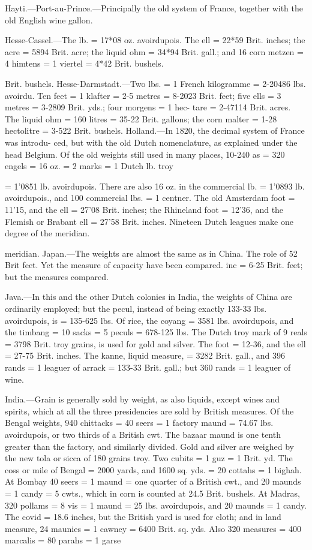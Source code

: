 \documentclass{article}
\begin{document}
Hayti.—Port-au-Prince.—Principally the old system of France, together with the old English wine gallon.

Hesse-Cassel.—The lb. = 17*08 oz. avoirdupois. The ell = 22*59 Brit. inches; the acre = 5894 Brit. acre; the liquid ohm = 34*94 Brit. gall.; and 16 corn metzen = 4 himtens = 1 viertel = 4*42 Brit. bushels.

Brit. bushels.
Hesse-Darmstadt.—Two lbs. = 1 French kilogramme = 2-20486
lbs. avoirdu. Ten feet = 1 klafter = 2-5 metres = 8-2023 Brit. feet;
five ells = 3 metres = 3-2809 Brit. yds.; four morgens = 1 hec-
tare = 2-47114 Brit. acres. The liquid ohm = 160 litres = 35-22
Brit. gallons; the corn malter = 1-28 hectolitre = 3-522 Brit.
bushels.
Holland.—In 1820, the decimal system of France was introdu-
ced, but with the old Dutch nomenclature, as explained under the
head Belgium. Of the old weights still used in many places,
10-240 as = 320 engels = 16 oz. = 2 marks = 1 Dutch lb. troy

= 1'0851 lb. avoirdupois. There are also 16 oz. in the commercial lb. = 1'0893 lb. avoirdupois., and 100 commercial lbs. = 1 centner. The old Amsterdam foot = 11'15, and the ell = 27'08 Brit. inches; the Rhineland foot = 12'36, and the Flemish or Brabant ell = 27'58 Brit. inches. Nineteen Dutch leagues make one degree of the meridian.

meridian.
Japan.—The weights are almost the same as in China. The role of 52 Brit feet. Yet the measure of capacity have been compared.
inc = 6-25 Brit. feet; but the measures compared.

Java.—In this and the other Dutch colonies in India, the weights of China are ordinarily employed; but the pecul, instead of being exactly 133-33 lbs. avoirdupois, is = 135-625 lbs. Of rice, the coyang = 3581 lbs. avoirdupois, and the timbang = 10 sacks = 5 peculs = 678-125 lbs. The Dutch troy mark of 9 reals = 3798 Brit. troy grains, is used for gold and silver. The foot = 12-36, and the ell = 27-75 Brit. inches. The kanne, liquid measure, = 3282 Brit. gall., and 396 rands = 1 leaguer of arrack = 133-33 Brit. gall.; but 360 rands = 1 leaguer of wine.

India.—Grain is generally sold by weight, as also liquids, except wines and spirits, which at all the three presidencies are sold by British measures. Of the Bengal weights, 940 chittacks = 40 seers = 1 factory maund = 74.67 lbs. avoirdupois, or two thirds of a British cwt. The bazaar maund is one tenth greater than the factory, and similarly divided. Gold and silver are weighed by the new tola or sicca of 180 grains troy. Two cubits = 1 guz = 1 Brit. yd. The coss or mile of Bengal = 2000 yards, and 1600 sq. yds. = 20 cottahs = 1 bighah. At Bombay 40 seers = 1 maund = one quarter of a British cwt., and 20 maunds = 1 candy = 5 cwts., which in corn is counted at 24.5 Brit. bushels. At Madras, 320 pollams = 8 vis = 1 maund = 25 lbs. avoirdupois, and 20 maunds = 1 candy. The covid = 18.6 inches, but the British yard is used for cloth; and in land measure, 24 maunies = 1 cawney = 6400 Brit. sq. yds. Also 320 measures = 400 marcalis = 80 parahs = 1 garse
\end{document}
